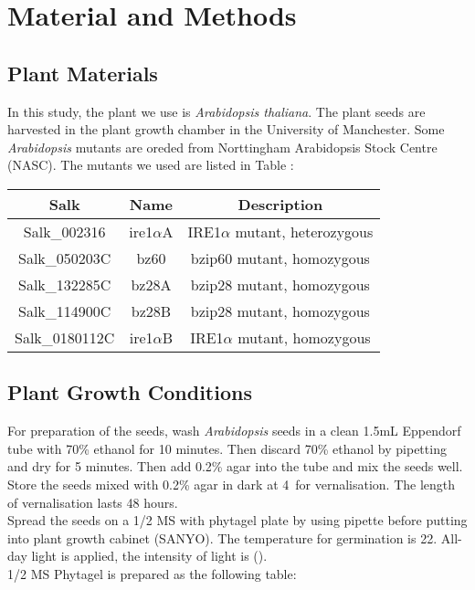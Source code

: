 \chapter{Material and Methods}
\section{Plant Materials}
In this study, the plant we use is \textit{Arabidopsis thaliana}. The plant seeds are harvested in the plant growth chamber in the University of Manchester. Some \textit{Arabidopsis} mutants are oreded from Norttingham Arabidopsis Stock Centre (NASC). The mutants we used are listed in Table :\\

\begin{tabular}[h]{|c|c|c|}
		\hline
		\textsf{\textbf{Salk \textnumero}} & \textsf{\textbf{Name}} & \textsf{\textbf{Description}}\\
		\hline
		Salk\_002316 & ire1$\alpha$A & IRE1$\alpha$ mutant, heterozygous \\
		\hline
		Salk\_050203C & bz60 & bzip60 mutant, homozygous \\
		\hline
		Salk\_132285C & bz28A & bzip28 mutant, homozygous \\
		\hline
		Salk\_114900C & bz28B & bzip28 mutant, homozygous \\
		\hline
		Salk\_0180112C & ire1$\alpha$B & IRE1$\alpha$ mutant, homozygous \\
		\hline
\end{tabular}
\linebreak
\linebreak
\section{Plant Growth Conditions}
For preparation of the seeds, wash \textit{Arabidopsis} seeds in a clean 1.5mL Eppendorf tube with 70\% ethanol for 10 minutes. Then discard 70\% ethanol by pipetting and dry for 5 minutes. Then add 0.2\% agar into the tube and mix the seeds well.\\
Store the seeds mixed with 0.2\% agar in dark at 4\textcelsius~for vernalisation. The length of vernalisation lasts 48 hours. \\
Spread the seeds on a 1/2 MS with phytagel plate by using pipette before putting into plant growth cabinet (SANYO). The temperature for germination is 22\textcelsius. All-day light is applied, the intensity of light is ().\\
1/2 MS Phytagel is prepared as the following table: \\

